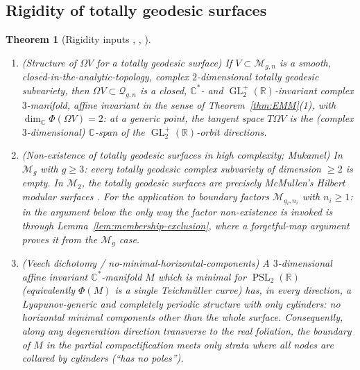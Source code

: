 \documentclass[11pt]{article}
\newcommand{\C}{\mathbb{C}}
\newcommand{\R}{\mathbb{R}}
\newcommand{\cQ}{\mathcal{Q}}
\newcommand{\M}{\mathcal{M}}
\DeclareMathOperator{\PSL}{PSL}
\DeclareMathOperator{\GL}{GL}
\newtheorem{thm}{Theorem}[section]
\theoremstyle{definition}
\theoremstyle{remark}
\begin{document}
\subsection{Rigidity of totally geodesic surfaces}

\begin{thm}[Rigidity inputs \cite{Mukamel}, \cite{McMullenHMS},
\cite{SW}]\label{thm:Mukamel}
\begin{enumerate}[label=(\arabic*)]
\item \emph{(Structure of $\Omega V$ for a totally geodesic surface)}
If $V \subset \M_{g,n}$ is a smooth, closed-in-the-analytic-topology,
complex $2$-dimensional totally geodesic subvariety, then
$\Omega V \subset \cQ_{g,n}$ is a closed, $\C^*$- and
$\GL_2^+(\R)$-invariant complex $3$-manifold, affine invariant in the
sense of Theorem~\ref{thm:EMM}(1), with $\dim_{\C}\Phi(\Omega V) = 2$:
at a generic point, the tangent space $T\Omega V$ is the (complex
$3$-dimensional) $\C$-span of the $\GL_2^+(\R)$-orbit directions.
\item \emph{(Non-existence of totally geodesic surfaces in high
complexity; Mukamel)} In $\M_g$ with $g \ge 3$: every totally geodesic
complex subvariety of dimension $\ge 2$ is empty. In $\M_2$, the
totally geodesic surfaces are
precisely McMullen's Hilbert modular surfaces \cite{McMullenHMS}.
For the application to boundary factors $\M_{g_i,n_i}$ with
$n_i \ge 1$: in the argument below the only way the factor
non-existence is invoked is through Lemma~\ref{lem:membership-exclusion},
where a forgetful-map argument proves it from the $\M_g$ case.
\item \emph{(Veech dichotomy / no-minimal-horizontal-components)}
A $3$-dimensional affine invariant $\C^*$-manifold $M$ which is minimal
for $\PSL_2(\R)$ (equivalently $\Phi(M)$ is a single Teichm\"uller
curve) has, in every direction, a Lyapunov-generic and completely
periodic structure with only cylinders: no horizontal minimal components
other than the whole surface. Consequently, along any degeneration
direction transverse to the real foliation, the boundary of $M$ in the
partial compactification meets only strata where all nodes are
collared by cylinders (``has no poles'').
\end{enumerate}
\end{thm}

\end{document}
